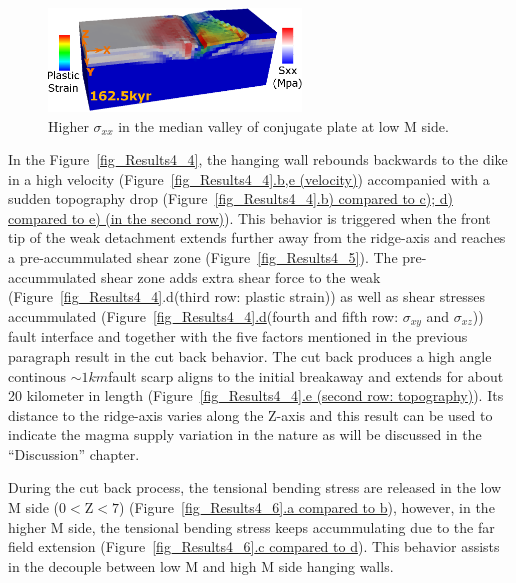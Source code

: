 \begin{figure}[hc]
  \centering
    \includegraphics[width=0.6\textwidth]{fig_Results4_7_sqrt_cut_back_conjugate_Sxx.eps}
  \caption{Higher $\sigma_{xx}$ in the median valley of conjugate plate at low M side. }
 \label{fig_Results4_7}
\end{figure}
In the Figure~\hyperref[fig_Results4_4]{\ref{fig_Results4_4}}, the hanging wall rebounds backwards to the dike in a high velocity (Figure~\hyperref[fig_Results4_4]{\ref{fig_Results4_4}.b,e (velocity)}) accompanied with a sudden topography drop (Figure~\hyperref[fig_Results4_4]{\ref{fig_Results4_4}.b) compared to c); d) compared to e) (in the second row)}). This behavior is triggered when the front tip of the weak detachment extends further away from the ridge-axis and reaches a pre-accummulated shear zone (Figure~\hyperref[fig_Results4_5]{\ref{fig_Results4_5}}). The pre-accummulated shear zone adds extra shear force to the weak (Figure~\hyperref[fig_Results4_4]{\ref{fig_Results4_4}}.d(third row: plastic strain)) as well as shear stresses accummulated (Figure~\hyperref[fig_Results4_4]{\ref{fig_Results4_4}.d}(fourth and fifth row: $\sigma_{xy}$ and $\sigma_{xz}$)) fault interface and together with the five factors mentioned in the previous paragraph result in the cut back behavior. The cut back produces a high angle continous $\sim 1km$fault scarp aligns to the initial breakaway and extends for about 20 kilometer in length (Figure~\hyperref[fig_Results4_4]{\ref{fig_Results4_4}.e (second row: topography)}). Its distance to the ridge-axis varies along the Z-axis and this result can be used to indicate the magma supply variation in the nature as will be discussed in the ``Discussion'' chapter. 

During the cut back process, the tensional bending stress are released in the low M side ($0<$Z$<7$) (Figure~\hyperref[fig_Results4_6]{\ref{fig_Results4_6}.a compared to b}), however, in the higher M side, the tensional bending stress keeps accummulating due to the far field extension (Figure~\hyperref[fig_Results4_6]{\ref{fig_Results4_6}.c compared to d}). This behavior assists in the decouple between low M and high M side hanging walls. 

